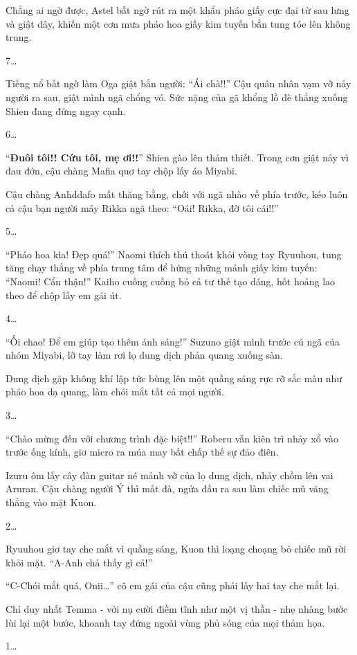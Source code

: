 \documentclass[../main.tex]{subfiles}
\begin{document}
Chẳng ai ngờ được, Astel bất ngờ rút ra một khẩu pháo giấy cực đại từ sau lưng và giật dây, khiến một cơn mưa pháo hoa giấy kim tuyến bắn tung tóe lên không trung.

7\dots

Tiếng nổ bất ngờ làm Oga giật bắn người: ``Ái chà!!'' Cậu quân nhân vạm vỡ nảy người ra sau, giật mình ngã chổng vó. Sức nặng của gã khổng lồ đè thẳng xuống Shien đang đứng ngay cạnh.

6\dots

``\textbf{Đuôi tôi!! Cứu tôi, mẹ ơi!!}'' Shien gào lên thảm thiết. Trong cơn giật nảy vì đau đớn, cậu chàng Mafia quơ tay chộp lấy áo Miyabi.

Cậu chàng Anhddafo mất thăng bằng, chới với ngã nhào về phía trước, kéo luôn cả cậu bạn người máy Rikka ngã theo: ``Oái! Rikka, đỡ tôi cái!!''

5\dots

``Pháo hoa kìa! Đẹp quá!'' Naomi thích thú thoát khỏi vòng tay Ryuuhou, tung tăng chạy thẳng về phía trung tâm để hứng những mảnh giấy kim tuyến: ``Naomi! Cẩn thận!'' Kaiho cuống cuồng bỏ cả tư thế tạo dáng, hốt hoảng lao theo để chộp lấy em gái út.

4\dots

``Ối chao! Để em giúp tạo thêm ánh sáng!'' Suzuno giật mình trước cú ngã của nhóm Miyabi, lỡ tay làm rơi lọ dung dịch phản quang xuống sàn.

Dung dịch gặp không khí lập tức bùng lên một quầng sáng rực rỡ sắc màu như pháo hoa dạ quang, làm chói mắt tất cả mọi người.

3\dots

``Chào mừng đến với chương trình đặc biệt!!'' Roberu vẫn kiên trì nhảy xổ vào trước ống kính, giơ micro ra múa may bất chấp thế sự đảo điên.

Izuru ôm lấy cây đàn guitar né mảnh vỡ của lọ dung dịch, nhảy chồm lên vai Aruran. Cậu chàng người Ý thì mất đà, ngửa đầu ra sau làm chiếc mũ văng thẳng vào mặt Kuon.

2\dots

Ryuuhou giơ tay che mắt vì quầng sáng, Kuon thì loạng choạng bỏ chiếc mũ rời khỏi mặt. ``A-Anh chả thấy gì cả!''

``C-Chói mắt quá, Onii\dots'' cô em gái của cậu cũng phải lấy hai tay che mắt lại.

Chỉ duy nhất Temma - với nụ cười điềm tĩnh như một vị thần - nhẹ nhàng bước lùi lại một bước, khoanh tay đứng ngoài vùng phủ sóng của mọi thảm họa.

1\dots
\end{document}
